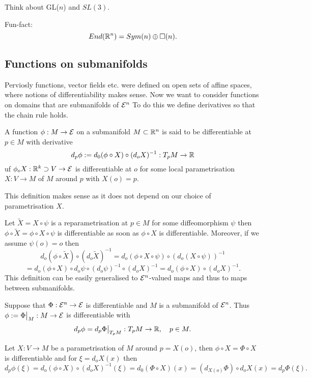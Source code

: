 \begin{exercise}
	Think about GL($n$) and $SL(3)$.
\end{exercise}

Fun-fact:
	\[ End(\mathbb R^n) = Sym(n) \oplus \square(n). \]
	
\subsection{Functions on submanifolds}

Perviosly functions, vector fields etc. were defined on open sets of affine spaces, where notions of differentiability makes sense.
Now we want to consider functions on domains that are submanifolds of $\mathcal E^n$ To do this we define derivatives so that the chain rule holds.

\begin{definition}
	A function $\phi: M \to \mathcal E$ on a submanifold $M \subset \mathbb R^n$ is said to be differentiable at $p \in M$ with derivative
		\[ d_p\phi := d_0(\phi \circ X) \circ (d_oX)^{-1} : T_pM \to \mathbb R  \]
	uf $\phi_oX : \mathbb R^k \supset V \to \mathcal E$ is differentiable at $o$ for some local parametrisation $X: V \to M$ of $M$ around $p$ with $X(o)=p$.
\end{definition}

\begin{remark}
	This definition makes sense as it does not depend on our choice of parametrisation $X$.
	
	Let $\tilde X= X \circ \psi$ is a reparametrisation at $p \in M$ for some diffeomorphism $\psi$ then $\phi \circ\tilde X = \phi  \circ  X\circ\psi$ is differentiable as soon as $\phi \circ X$ is differentiable. Moreover, if we assume $\psi(o)=o$ then 
		\[ d_o(\phi \circ \tilde X) \circ (d_o\tilde X)^{-1}
			= d_o(\phi \circ X \circ \psi) \circ (d_o(X \circ \psi))^{-1}
			 \]
		\[ = d_o(\phi \circ X) \circ d_o\psi \circ (d_o\psi)^{-1} \circ (d_oX)^{-1}
		= d_o(\phi \circ X)  \circ (d_oX)^{-1}. \]
	This definition can be easily generalised to $\mathcal E^n$-valued maps and thus to maps between submanifolds.
\end{remark}

\begin{remark}
	Suppose that $\Phi: \mathcal E^n \to \mathcal E$ is differentiable and $M$ is a submanifold of $\mathcal E^n$. Thus $\phi:= \Phi \big|_M :M \to \mathcal E$ is differentiable with
		\[ d_p\phi = d_p\Phi \big|_{T_pM} : T_pM \to \mathbb R, \quad p \in M. \] 
	
	Let $X: V \to M$ be a parametrisation of $M$ around $p=X(o)$, then $\phi \circ X = \Phi \circ X$ is differentiable and for $\xi = d_oX(x)$ then
		\[ d_p\phi(\xi) = d_o(\phi \circ X) \circ (d_oX)^{-1}(\xi)
			= d_0(\Phi \circ X)(x) = (d_{X(o)} \Phi) \circ d_oX(x)
			= d_p\Phi(\xi). \]  
\end{remark}

